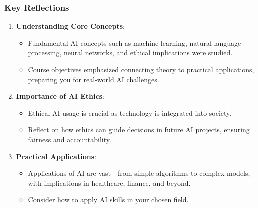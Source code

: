 \documentclass[aspectratio=169]{beamer}
\begin{document}
\begin{frame}[fragile]
    \frametitle{Key Reflections}
    \begin{enumerate}
        \item \textbf{Understanding Core Concepts}:
        \begin{itemize}
            \item Fundamental AI concepts such as machine learning, natural language processing, neural networks, and ethical implications were studied.
            \item Course objectives emphasized connecting theory to practical applications, preparing you for real-world AI challenges.
        \end{itemize}

        \item \textbf{Importance of AI Ethics}:
        \begin{itemize}
            \item Ethical AI usage is crucial as technology is integrated into society. 
            \item Reflect on how ethics can guide decisions in future AI projects, ensuring fairness and accountability.
        \end{itemize}

        \item \textbf{Practical Applications}:
        \begin{itemize}
            \item Applications of AI are vast—from simple algorithms to complex models, with implications in healthcare, finance, and beyond.
            \item Consider how to apply AI skills in your chosen field.
        \end{itemize}
    \end{enumerate}
\end{frame}
\end{document}
